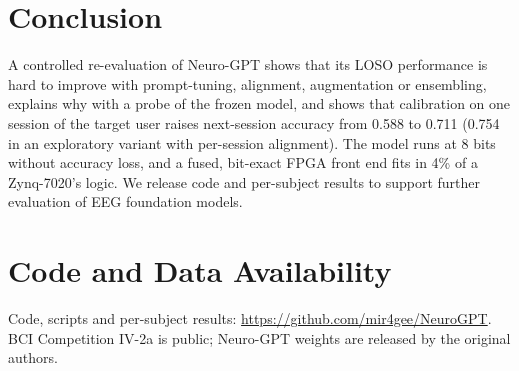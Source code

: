 \documentclass[conference]{IEEEtran}
\begin{document}
\section{Conclusion}
A controlled re-evaluation of Neuro-GPT shows that its LOSO performance is hard to improve with prompt-tuning, alignment,
augmentation or ensembling, explains why with a probe of the frozen model, and shows that calibration on one session of
the target user raises next-session accuracy from 0.588 to 0.711 (0.754 in an exploratory variant with per-session alignment). The model runs at 8 bits without accuracy loss, and a
fused, bit-exact FPGA front end fits in 4\% of a Zynq-7020's logic. We release code and per-subject results to support
further evaluation of EEG foundation models.

\section*{Code and Data Availability}
Code, scripts and per-subject results: \url{https://github.com/mir4gee/NeuroGPT}. BCI Competition IV-2a is public;
Neuro-GPT weights are released by the original authors.



\end{document}
